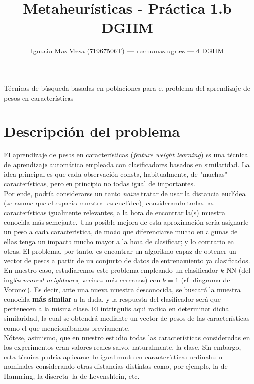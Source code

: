 \documentclass[11pt]{article}
\theoremstyle{plain}
\theoremstyle{definition}
\begin{document}
\title{Metaheurísticas - Práctica 1.b \\
  DGIIM}
Técnicas de búsqueda basadas en poblaciones para el problema
  del aprendizaje de pesos en características
\date{}
\author{Ignacio Mas Mesa (71967506T) --- nachomas\@correo.ugr.es --- 4 DGIIM}

\maketitle

\tableofcontents

\section{Descripción del problema}

El aprendizaje de pesos en características (\textit{feature weight
  learning}) es una técnica de aprendizaje automático empleada con
clasificadores basados en similaridad. La idea principal es que
cada observación consta, habitualmente, de "muchas" características,
pero en principio no todas igual de importantes. \\


Por ende, podría
considerarse un tanto \textit{naïve} tratar de usar la distancia
euclídea (se asume que el
espacio muestral es euclídeo), considerando todas las características
igualmente relevantes, a la hora de encontrar la(s) muestra conocida más
semejante. Una posible mejora de esta aproximación sería asignarle un
peso a cada característica, de modo que diferenciarse mucho en algunas
de ellas tenga un impacto mucho mayor a la hora de clasificar; y lo
contrario en otras. El problema, por tanto, es encontrar un algoritmo
capaz de obtener un vector de pesos a partir de un conjunto de datos
de entrenamiento ya clasificados. \\


En nuestro caso, estudiaremos este problema empleando un clasificador
$k$-NN (del inglés \textit{nearest neighbours}, vecinos más cercanos)
con $k = 1$ (cf. diagrama de Voronoi). Es decir, ante una nueva muestra desconocida, se buscará
la muestra conocida \textbf{más similar} a la dada, y la respuesta del
clasificador será que pertenecen a la misma clase. El intríngulis aquí
radica en determinar dicha similaridad, la cual se obtendrá mediante
un vector de pesos de las características como el que mencionábamos previamente. \\

Nótese, asimismo, que en nuestro estudio todas las características
consideradas en los experimentos eran valores reales salvo,
naturalmente, la clase. Sin embargo, esta técnica podría aplicarse de
igual modo en características ordinales o nominales considerando otras distancias
distintas como, por ejemplo, la de Hamming, la discreta, la de
Levenshtein, etc. \\
\end{document}
